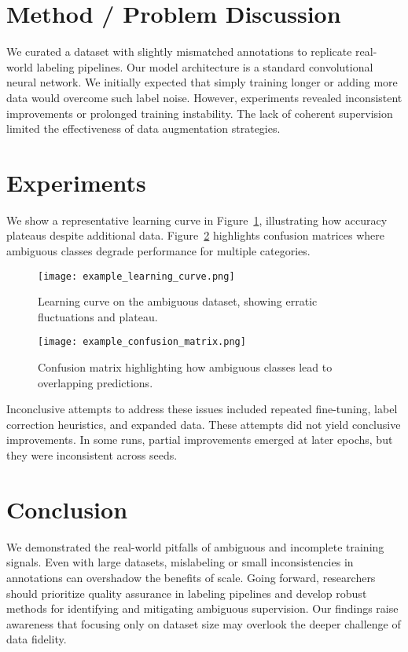 \documentclass{article}
\begin{document}
\section{Method / Problem Discussion}
We curated a dataset with slightly mismatched annotations to replicate real-world labeling pipelines. Our model architecture is a standard convolutional neural network. We initially expected that simply training longer or adding more data would overcome such label noise. However, experiments revealed inconsistent improvements or prolonged training instability. The lack of coherent supervision limited the effectiveness of data augmentation strategies.

\section{Experiments}
We show a representative learning curve in Figure~\ref{fig:main-curve}, illustrating how accuracy plateaus despite additional data. Figure~\ref{fig:conf-matrix} highlights confusion matrices where ambiguous classes degrade performance for multiple categories.

\begin{figure}[t]
\centering
\texttt{[image: example\_learning\_curve.png]}
\caption{Learning curve on the ambiguous dataset, showing erratic fluctuations and plateau.}
\label{fig:main-curve}
\end{figure}

\begin{figure}[t]
\centering
\texttt{[image: example\_confusion\_matrix.png]}
\caption{Confusion matrix highlighting how ambiguous classes lead to overlapping predictions.}
\label{fig:conf-matrix}
\end{figure}

Inconclusive attempts to address these issues included repeated fine-tuning, label correction heuristics, and expanded data. These attempts did not yield conclusive improvements. In some runs, partial improvements emerged at later epochs, but they were inconsistent across seeds.

\section{Conclusion}
We demonstrated the real-world pitfalls of ambiguous and incomplete training signals. Even with large datasets, mislabeling or small inconsistencies in annotations can overshadow the benefits of scale. Going forward, researchers should prioritize quality assurance in labeling pipelines and develop robust methods for identifying and mitigating ambiguous supervision. Our findings raise awareness that focusing only on dataset size may overlook the deeper challenge of data fidelity.
\end{document}

